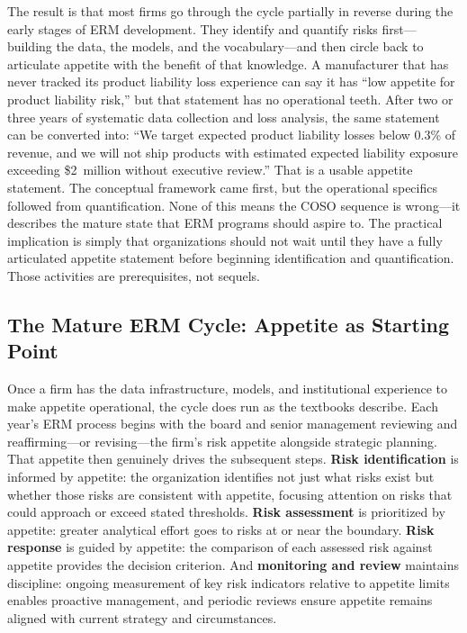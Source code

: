 \documentclass[11pt,openany]{book}
\begin{document}
The result is that most firms go through the cycle partially in reverse during
the early stages of ERM development. They identify and quantify risks
first---building the data, the models, and the vocabulary---and then circle back
to articulate appetite with the benefit of that knowledge. A manufacturer that
has never tracked its product liability loss experience can say it has ``low
appetite for product liability risk,'' but that statement has no operational
teeth. After two or three years of systematic data collection and loss analysis,
the same statement can be converted into: ``We target expected product liability
losses below 0.3\% of revenue, and we will not ship products with estimated
expected liability exposure exceeding \$2~million without executive review.''
That is a usable appetite statement. The conceptual framework came first, but
the operational specifics followed from quantification. None of this means the
COSO sequence is wrong---it describes the mature state that ERM programs should
aspire to. The practical implication is simply that organizations should not
wait until they have a fully articulated appetite statement before beginning
identification and quantification. Those activities are prerequisites, not
sequels.

\subsection{The Mature ERM Cycle: Appetite as Starting Point}
\label{subsec:mature-erm-cycle}

Once a firm has the data infrastructure, models, and institutional experience to
make appetite operational, the cycle does run as the textbooks describe. Each
year's ERM process begins with the board and senior management reviewing and
reaffirming---or revising---the firm's risk appetite alongside strategic
planning. That appetite then genuinely drives the subsequent steps.
\textbf{Risk identification} is informed by appetite: the organization
identifies not just what risks exist but whether those risks are consistent with
appetite, focusing attention on risks that could approach or exceed stated
thresholds. \textbf{Risk assessment} is prioritized by appetite: greater
analytical effort goes to risks at or near the boundary. \textbf{Risk response}
is guided by appetite: the comparison of each assessed risk against appetite
provides the decision criterion. And \textbf{monitoring and review} maintains
discipline: ongoing measurement of key risk indicators relative to appetite
limits enables proactive management, and periodic reviews ensure appetite
remains aligned with current strategy and circumstances.
\end{document}
